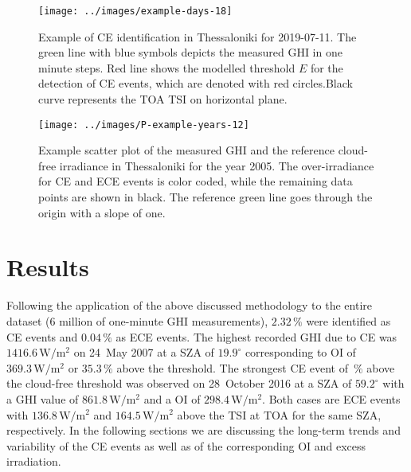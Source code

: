 \documentclass[preprint, 5p,
authoryear]{elsarticle} %
\begin{document}
\begin{figure}[H]

{\centering \texttt{[image: ../images/example-days-18]} 

}

\caption{Example of CE identification in Thessaloniki for 2019-07-11. The green line with blue symbols depicts the measured GHI in one minute steps. Red line shows the modelled threshold $E$ for the detection of CE events, which are denoted with red circles.Black curve represents the TOA TSI on horizontal plane.}\label{fig:example-day}
\end{figure}

\begin{figure}[H]

{\centering \texttt{[image: ../images/P-example-years-12]} 

}

\caption{Example scatter plot of the measured GHI and the reference cloud-free irradiance in Thessaloniki for the year 2005. The over-irradiance for CE and ECE events is color coded, while the remaining data points are shown in black. The reference green line goes through the origin with a slope of one.}\label{fig:example-year}
\end{figure}

\hypertarget{results}{%
\section{Results}\label{results}}

Following the application of the above discussed methodology to the
entire dataset (\(6\) million of one-minute GHI measurements),
\(2.32\,\%\) were identified as CE events and \(0.04\,\%\) as ECE
events. The highest recorded GHI due to CE was
\(1416.6\,\text{W}/\text{m}^2\) on 24~May 2007 at a SZA of
\(19.9^\circ\) corresponding to OI of \(369.3\,\text{W}/\text{m}^2\) or
\(35.3\,\%\) above the threshold. The strongest CE event of \(\,\%\)
above the cloud-free threshold was observed on 28~October 2016 at a SZA
of \(59.2^\circ\) with a GHI value of \(861.8\,\text{W}/\text{m}^2\) and
a OI of \(298.4\,\text{W}/\text{m}^2\). Both cases are ECE events with
\(136.8\,\text{W}/\text{m}^2\) and \(164.5\,\text{W}/\text{m}^2\) above
the TSI at TOA for the same SZA, respectively. In the following sections
we are discussing the long-term trends and variability of the CE events
as well as of the corresponding OI and excess irradiation.
\end{document}
